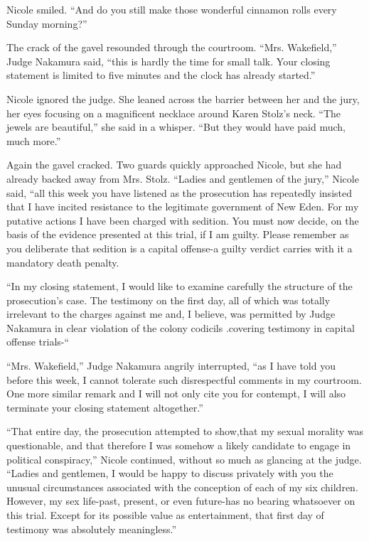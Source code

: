 \documentclass[]{article}
\begin{document}
{{Nicole smiled. “And do you still make those wonderful cinnamon rolls every Sunday morning?”

The crack of the gavel resounded through the courtroom. “Mrs. Wakefield,” Judge Nakamura said, “this is hardly the time for small talk. Your closing statement is limited to five minutes and the clock has already started.”

Nicole ignored the judge. She leaned across the barrier between her and the jury, her eyes focusing on a magnificent necklace around Karen Stolz’s neck. “The jewels are beautiful,” she said in a whisper. “But they would have paid much, much more.”

Again the gavel cracked. Two guards quickly approached Nicole, but she had already backed away from Mrs. Stolz. “Ladies and gentlemen of the jury,” Nicole said, “all this week you have listened as the prosecution has repeatedly insisted that I have incited resistance to the legitimate government of New Eden. For my putative actions I have been charged with sedition. You must now decide, on the basis of the evidence presented at this trial, if I am guilty. Please remember as you deliberate that sedition is a capital offense-a guilty verdict carries with it a mandatory death penalty.

“In my closing statement, I would like to examine carefully the structure of the prosecution’s case. The testimony on the first day, all of which was totally irrelevant to the charges against me and, I believe, was permitted by Judge Nakamura in clear violation of the colony codicils .covering testimony in capital offense trials-“

“Mrs. Wakefield,” Judge Nakamura angrily interrupted, “as I have told you before this week, I cannot tolerate such disrespectful comments in my courtroom. One more similar remark and I will not only cite you for contempt, I will also terminate your closing statement altogether.”

“That entire day, the prosecution attempted to show,that my sexual morality was questionable, and that therefore I was somehow a likely candidate to engage in political conspiracy,” Nicole continued, without so much as glancing at the judge. “Ladies and gentlemen, I would be happy to discuss privately with you the unusual circumstances associated with the conception of each of my six children. However, my sex life-past, present, or even future-has no bearing whatsoever on this trial. Except for its possible value as entertainment, that first day of testimony was absolutely meaningless.”

}}
\end{document}
